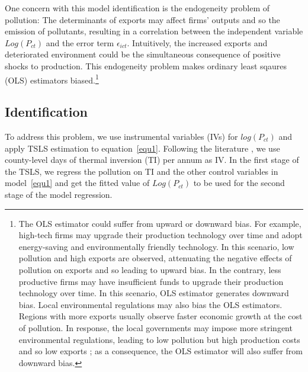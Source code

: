 \documentclass[12pt]{article}
\begin{document}
One concern with this model identification is the endogeneity problem of pollution: The determinants of exports may affect firms' outputs and so the emission of pollutants, resulting in a correlation between the independent variable $Log(P_{ct})$ and the error term $\epsilon _{ict}$. Intuitively, the increased exports and deteriorated environment could be the simultaneous consequence of positive shocks to production. This endogeneity problem makes ordinary least sqaures (OLS) estimators biased.\footnote{The OLS estimator could suffer from upward or downward bias. For example, high-tech firms may upgrade their production technology over time and adopt energy-saving and environmentally friendly technology. In this scenario, low pollution and high exports are observed, attenuating the negative effects of pollution on exports and so leading to upward bias. In the contrary, less productive firms
may have insufficient funds to upgrade their production technology over
time. In this scenario, OLS estimator generates downward bias. Local
environmental regulations may also bias the OLS estimators. Regions with more exports usually observe faster economic growth at the cost of pollution. In response, the local governments may impose more stringent environmental
regulations, leading to low pollution but high production costs and so low exports \citep{cherniwchan2022environmental,shi2018environmental}; as a consequence, the OLS estimator will also suffer from downward bias.}
\subsection{Identification} \label{sec:identification}
To address this problem, we use instrumental variables (IVs) for $log(P_{ct})$ and apply TSLS estimation to equation~\ref{equ1}. Following the literature \citep{arceo2016does,jans2018economic,sager2019estimating,fu2021air,khanna2021productivity}, we use county-level days of thermal inversion (TI) per annum as IV. In the first stage of the TSLS, we regress the pollution on TI and the other control variables in model~\ref{equ1} and get the fitted value of $Log(P_{ct})$ to be used for the second stage of the model regression. 
\end{document}
